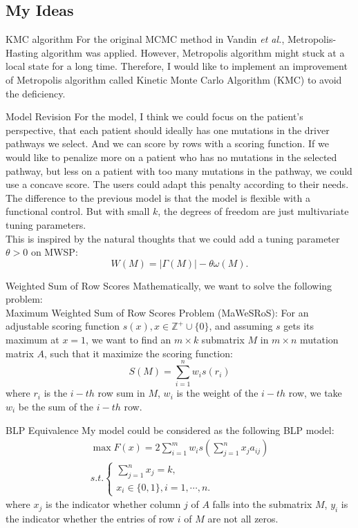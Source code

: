 \documentclass[xcolor=dvipsnames]{beamer}
\begin{document}
\subsection{My Ideas}
\begin{frame}{KMC algorithm}
For the original MCMC method in Vandin {\em et al.}, Metropolis-Hasting algorithm was applied. However, Metropolis algorithm might stuck at a local state for a long time. Therefore, I would like to implement an improvement of Metropolis algorithm called Kinetic Monte Carlo Algorithm (KMC) to avoid the deficiency.\\
\end{frame}
\begin{frame}{Model Revision}
For the model, I think we could focus on the patient's perspective, that each patient should ideally has one mutations in the driver pathways we select. And we can score by rows with a scoring function. If we would like to penalize more on a patient who has no mutations in the selected pathway, but less on a patient with too many mutations in the pathway, we could use a concave score. The users could adapt this penalty according to their needs.\\
The difference to the previous model is that the model is flexible with a functional control. But with small $k$, the degrees of freedom are just multivariate tuning parameters.\\
This is inspired by the natural thoughts that we could add a tuning parameter $\theta>0$ on MWSP:
\[
W(M)=|\Gamma(M)|-\theta \omega(M).
\]
\end{frame}
\begin{frame}{Weighted Sum of Row Scores}
Mathematically, we want to solve the following problem:\\
Maximum Weighted Sum of Row Scores Problem (MaWeSRoS): For an adjustable scoring function $s(x),x\in \mathbb{Z}^+\cup \{0\}$, and assuming $s$ gets its maximum at $x=1$,  we want to find an $m\times k$ submatrix $M$ in $m\times n$ mutation matrix $A$, such that it maximize the scoring function:
\[
S(M)=\sum_{i=1}^nw_is(r_i)
\]
where $r_i$ is the $i-th$ row sum in $M$, $w_i$ is the weight of the $i-th$ row, we take $w_i$ be the sum of the $i-th$ row.\\
\end{frame}
\begin{frame}{BLP Equivalence}
My model could be considered as the following BLP model:
\begin{eqnarray}
\max F(x)=2\sum_{i=1}^mw_is(\sum_{j=1}^nx_ja_{ij})\nonumber\\
s.t.
\left\{
\begin{array}{c}
\sum_{j=1}^nx_j=k,\\
x_i\in\{0,1\},i=1,\cdots,n.
\end{array}
\right.\nonumber
\end{eqnarray}
where $x_j$ is the indicator whether column $j$ of $A$ falls into the submatrix $M$, $y_i$ is the indicator whether the entries of row $i$ of $M$ are not all zeros.\\
\end{frame}
\end{document}

